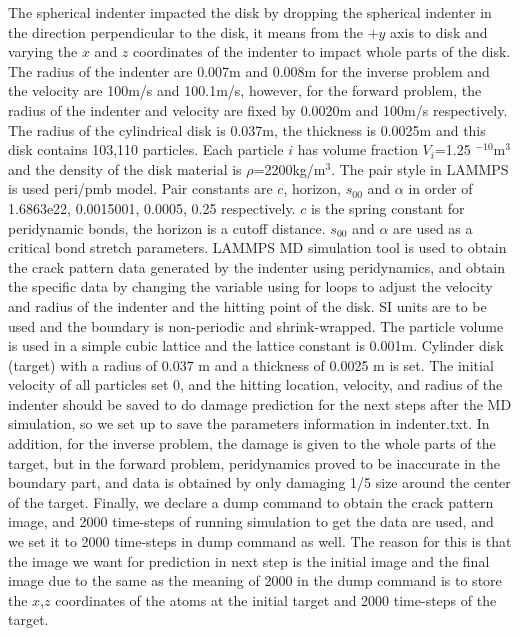 The spherical indenter impacted the disk by dropping the spherical indenter in the direction perpendicular to the disk, it means from the ${+y}$ axis to disk and varying the $x$ and $z$ coordinates of the indenter to impact whole parts of the disk. The radius of the indenter are 0.007m and 0.008m for the inverse problem and the velocity are 100m/s and 100.1m/s, however, for the forward problem, the radius of the indenter and velocity are fixed by 0.0020m and 100m/s respectively. The radius of the cylindrical disk is 0.037m, the thickness is 0.0025m and this disk contains 103,110 particles. Each particle $i$ has volume fraction $V_i$=1.25 $^{-10}$m$^3$ and the density of the disk material is $\rho$=2200kg/m$^3$. The pair style in LAMMPS is used peri/pmb model. Pair constants are $c$, horizon, $s_{00}$ and $\alpha$ in order of 1.6863e22, 0.0015001, 0.0005, 0.25 respectively. $c$ is the spring constant for peridynamic bonds, the horizon is a cutoff distance. $s_{00}$ and $\alpha$ are used as a critical bond stretch parameters. LAMMPS MD simulation tool is used to obtain the crack pattern data generated by the indenter using peridynamics, and obtain the specific data by changing the variable using for loops to adjust the velocity and radius of the indenter and the hitting point of the disk. SI units are to be used and the boundary is non-periodic and shrink-wrapped. The particle volume is used in a simple cubic lattice and the lattice constant is 0.001m. Cylinder disk (target) with a radius of 0.037 m and a thickness of 0.0025 m is set. The initial velocity of all particles set 0, and the hitting location, velocity, and radius of the indenter should be saved to do damage prediction for the next steps after the MD simulation, so we set up to save the parameters information in indenter.txt. In addition, for the inverse problem, the damage is given to the whole parts of the target, but in the forward problem, peridynamics proved to be inaccurate in the boundary part, and data is obtained by only damaging 1/5 size around the center of the target. Finally, we declare a dump command to obtain the crack pattern image, and 2000 time-steps of running simulation to get the data are used, and we set it to 2000 time-steps in dump command as well. The reason for this is that the image we want for prediction in next step is the initial image and the final image due to the same as the meaning of 2000 in the dump command is to store the $x$,$z$ coordinates of the atoms at the initial target and 2000 time-steps of the target. 

